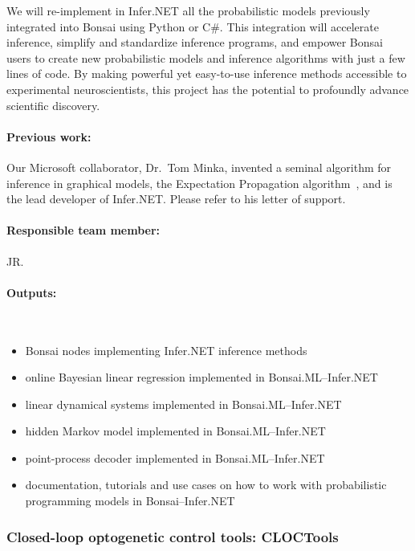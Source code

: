 We will re-implement in Infer.NET all the probabilistic models previously
integrated into Bonsai using Python or C\#. This integration will accelerate
inference, simplify and standardize inference programs, and empower Bonsai
users to create new probabilistic models and inference algorithms with just a
few lines of code. By making powerful yet easy-to-use inference methods
accessible to experimental neuroscientists, this project has the potential to
profoundly advance scientific discovery.

\paragraph{Previous work:} Our Microsoft collaborator, Dr.~Tom Minka, invented
a seminal algorithm for inference in graphical models, the Expectation
Propagation algorithm~\citep{minka01}, and is the lead developer of Infer.NET.
Please refer to his letter of support.

\paragraph{Responsible team member:} JR.

\paragraph{Outputs:}\mbox{}\\

\begin{itemize}

    \item Bonsai nodes implementing Infer.NET inference methods
    \item online Bayesian linear regression implemented in Bonsai.ML--Infer.NET
    \item linear dynamical systems implemented in Bonsai.ML--Infer.NET
    \item hidden Markov model implemented in Bonsai.ML--Infer.NET
    \item point-process decoder implemented in Bonsai.ML--Infer.NET
    \item documentation, tutorials and use cases on how to work with
probabilistic programming models in Bonsai--Infer.NET \end{itemize}

\subsubsection*{Closed-loop optogenetic control tools: CLOCTools}

